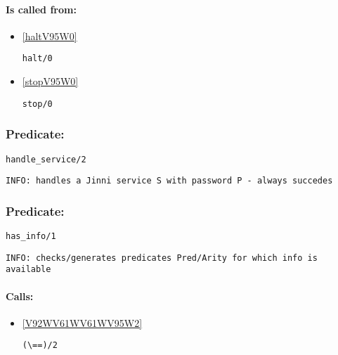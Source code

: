 \paragraph{Is called from:} 
\begin{itemize}
\item \ref{haltV95W0} 
\begin{verbatim}
halt/0
\end{verbatim}

\item \ref{stopV95W0} 
\begin{verbatim}
stop/0
\end{verbatim}

\end{itemize}

\subsubsection{Predicate:} \label{handleV95WserviceV95W2}

\begin{verbatim}
handle_service/2
\end{verbatim}

{\small \begin{verbatim}
INFO: handles a Jinni service S with password P - always succedes

\end{verbatim}}

\subsubsection{Predicate:} \label{hasV95WinfoV95W1}

\begin{verbatim}
has_info/1
\end{verbatim}

{\small \begin{verbatim}
INFO: checks/generates predicates Pred/Arity for which info is available

\end{verbatim}}
\paragraph{Calls:} 
\begin{itemize}
\item \ref{V92WV61WV61WV95W2} 
\begin{verbatim}
(\==)/2
\end{verbatim}

\end{itemize}

